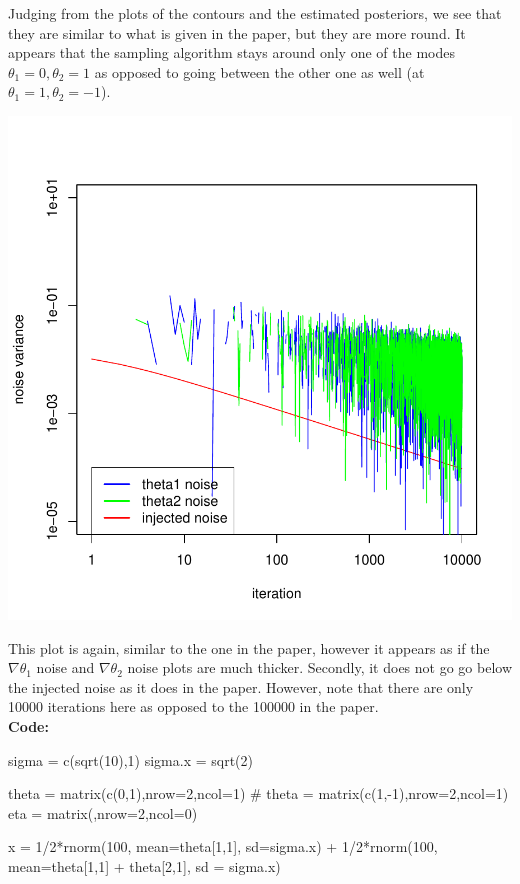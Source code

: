 \documentclass[letterpaper,12pt]{amsart}
\newenvironment{verbatimcode}{\bigskip \scriptsize \verbatim}{\endverbatim \normalsize \bigskip}
\begin{document}
\begin{enumerate}[1.]
Judging from the plots of the contours and the estimated posteriors, we see that they are similar to what is given in the paper, but they are more round. It appears that the sampling algorithm stays around only one of the modes $\theta_1 = 0, \theta_2 = 1$ as opposed to going between the other one as well (at $\theta_1 = 1, \theta_2 = -1$).
\begin{center}
\includegraphics[scale=0.5]{fig2left.pdf}
\end{center}
This plot is again, similar to the one in the paper, however it appears as if the $\nabla \theta_1$ noise and $\nabla \theta_2$ noise plots are much thicker. Secondly, it does not go go below the injected noise as it does in the paper. However, note that there are only 10000 iterations here as opposed to the 100000 in the paper.\\

\noindent
\textbf{Code:}

\begin{verbatimcode}
sigma = c(sqrt(10),1)
sigma.x = sqrt(2)

theta = matrix(c(0,1),nrow=2,ncol=1)
# theta = matrix(c(1,-1),nrow=2,ncol=1)
eta = matrix(,nrow=2,ncol=0)

x = 1/2*rnorm(100, mean=theta[1,1], sd=sigma.x) +
  1/2*rnorm(100, mean=theta[1,1] + theta[2,1], sd = sigma.x)


\end{verbatimcode}
\end{enumerate}
\end{document}
